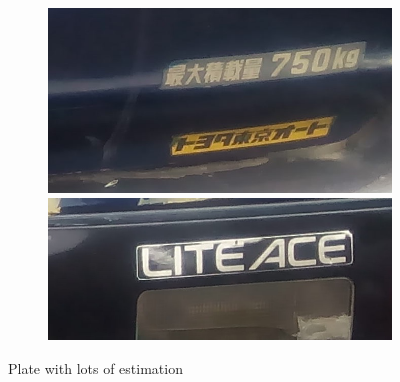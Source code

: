 \begin{figure}
\begin{subfigure}{0.24\textwidth}
\end{subfigure}
\begin{subfigure}{0.24\textwidth}
    \centering
    \includegraphics[width=0.9\linewidth]{./img/experiment/stage.8/01-private}
    \\ \vspace{0.3cm}
    \includegraphics[width=0.9\linewidth]{./img/experiment/stage.8/03-private}
\end{subfigure}
\caption{Plate with lots of estimation}
\label{fig:Estimate2}
\end{figure}


